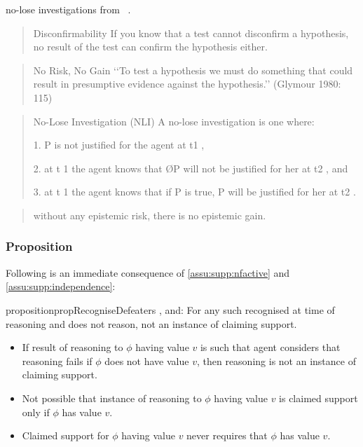 \begin{note}
  \color{red}

  no-lose investigations from ~\cite{Weisberg:2012vs}.

  \begin{quote}
    Disconﬁrmability If you know that a test cannot disconﬁrm a hypothesis, no result of the test can conﬁrm the hypothesis either.
  \end{quote}

  \begin{quote}
    No Risk, No Gain ‘‘To test a hypothesis we must do something that could result in presumptive evidence against the hypothesis.’’ (Glymour 1980: 115)
  \end{quote}

  \begin{quote}
    No-Lose Investigation (NLI) A no-lose investigation is one where:

1. P is not justiﬁed for the agent at t1 ,

2. at t 1 the agent knows that ØP will not be justiﬁed for her at t2 , and

3. at t 1 the agent knows that if P is true, P will be justiﬁed for her at t2 .
\end{quote}

\begin{quote}
  without any epistemic risk, there is no epistemic gain.
\end{quote}
\end{note}

\subsubsection{Proposition}
\label{sec:proposition}

\begin{note}
  Following is an immediate consequence of \ref{assu:supp:nfactive} and \autoref{assu:supp:independence}:

  \begin{restatable}{proposition}{propRecogniseDefeaters}
    \label{prop:CS-only-if-reason-recognised-defeaters}
    \requ{}, and:
    For any such recognised \requ{} at time of reasoning and does not reason, not an instance of claiming support.
  \end{restatable}
\end{note}

  \begin{note}
  \begin{itemize}
  \item If result of reasoning to \(\phi\) having value \(v\) is such that agent considers that reasoning fails if \(\phi\) does not have value \(v\), then reasoning is not an instance of claiming support.
  \item Not possible that instance of reasoning to \(\phi\) having value \(v\) is claimed support only if \(\phi\) has value \(v\).
  \item Claimed support for \(\phi\) having value \(v\) never requires that \(\phi\) has value \(v\).
  \end{itemize}
\end{note}


